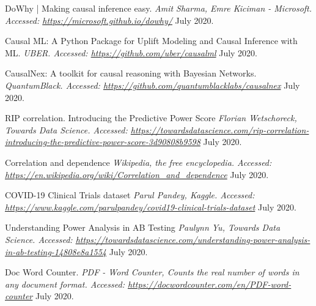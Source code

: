 \begin{thebibliography}{1}
 DoWhy | Making causal inference easy. {\em 	Amit Sharma, Emre Kiciman - Microsoft. Accessed:  \url{https://microsoft.github.io/dowhy/}} July 2020.

 Causal ML: A Python Package for Uplift Modeling and Causal Inference with ML. {\em UBER. Accessed:  \url{https://github.com/uber/causalml}} July 2020.

 CausalNex: A toolkit for causal reasoning with Bayesian Networks. {\em QuantumBlack. Accessed:  \url{https://github.com/quantumblacklabs/causalnex}} July 2020.

 RIP correlation. Introducing the Predictive Power Score {\em Florian Wetschoreck, Towards Data Science. Accessed:  \url{https://towardsdatascience.com/rip-correlation-introducing-the-predictive-power-score-3d90808b9598}} July 2020.

 Correlation and dependence {\em Wikipedia, the free encyclopedia. Accessed:  \url{https://en.wikipedia.org/wiki/Correlation_and_dependence}} July 2020.

 COVID-19 Clinical Trials dataset {\em Parul Pandey, Kaggle.
Accessed:  \url{https://www.kaggle.com/parulpandey/covid19-clinical-trials-dataset}} July 2020.

 Understanding Power Analysis in AB Testing {\em Paulynn Yu, Towards Data Science.
Accessed:  \url{https://towardsdatascience.com/understanding-power-analysis-in-ab-testing-14808e8a1554}} July 2020.

 Doc Word Counter. {\em 	PDF - Word Counter, Counts the real number of words in any document format. Accessed:  \url{https://docwordcounter.com/en/PDF-word-counter}} July 2020.

\end{thebibliography}